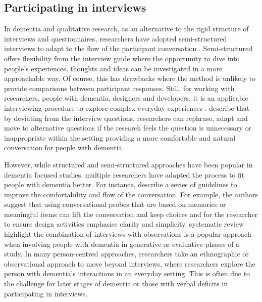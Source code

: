 \subsection{Participating in interviews}
\label{PD:Interviews}
In dementia and qualitative research, as an alternative to the rigid structure of interviews and questionnaires, researchers have adopted semi-structured interviews to adapt to the flow of the participant conversation \citep{cheston2000involving}. Semi-structured offers flexibility from the interview guide where the opportunity to dive into people’s experiences, thoughts and ideas can be investigated in a more approachable way. Of course, this has drawbacks where the method is unlikely to provide comparisons between participant responses. Still, for working with researchers, people with dementia, designers and developers, it is an applicable interviewing procedure to explore complex everyday experiences \citep{horton2004qualitative}. \cite{samsi2020interviewing} describe that by deviating from the interview questions, researchers can rephrase, adapt and move to alternative questions if the research feels the question is unnecessary or inappropriate within the setting providing a more comfortable and natural conversation for people with dementia.

However, while structured and semi-structured approaches have been popular in dementia focused studies, multiple researchers have adapted the process to fit people with dementia better. For instance, \cite{mayer2013lessons} describe a series of guidelines to improve the comfortability and flow of the conversation. For example, the authors suggest that using conversational probes that are based on memories or meaningful items can lift the conversation and keep choices and for the researcher to ensure design activities emphasise clarity and simplicity. \cite{suijkerbuijk_active_2019} systematic review highlight the combination of interviews with observations is a popular approach when involving people with dementia in generative or evaluative phases of a study. In many person-centred approaches, researchers take an ethnographic or observational approach to move beyond interviews, where researchers explore the person with dementia's interactions in an everyday setting. This is often due to the challenge for later stages of dementia or those with verbal deficits in participating in interviews.

